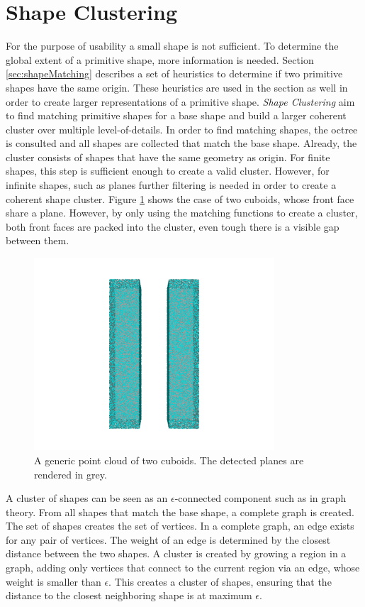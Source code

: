 \section{Shape Clustering}

For the purpose of usability a small shape is not sufficient. To determine the global extent of a primitive shape, more information is needed. Section \ref{sec:shapeMatching} describes a set of heuristics to determine if two primitive shapes have the same origin. These heuristics are used in the section as well in order to create larger representations of a primitive shape. 
\textit{Shape Clustering} aim to find matching primitive shapes for a base shape and build a larger coherent cluster over multiple level-of-details. 
In order to find matching shapes, the octree is consulted and all shapes are collected that match the base shape. Already, the cluster consists of shapes that have the same geometry as origin. For finite shapes, this step is sufficient enough to create a valid cluster. However, for infinite shapes, such as planes further filtering is needed in order to create a coherent shape cluster. Figure \ref{fig:cuboids} shows the case of two cuboids, whose front face share a plane. However, by only using the matching functions to create a cluster, both front faces are packed into the cluster, even tough there is a visible gap between them.

\begin{figure}
	\centering
	\includegraphics[width=0.8\textwidth]{Shape_Detection/cuboids.png}
	\caption{A generic point cloud of two cuboids. The detected planes are rendered in grey.}
	\label{fig:cuboids}
\end{figure}

A cluster of shapes can be seen as an $\epsilon$-connected component such as in graph theory. From all shapes that match the base shape, a complete graph is created. The set of shapes creates the set of vertices. In a complete graph, an edge exists for any pair of vertices. The weight of an edge is determined by the closest distance between the two shapes. A cluster is created by growing a region in a graph, adding only vertices that connect to the current region via an edge, whose weight is smaller than $\epsilon$. This creates a cluster of shapes, ensuring that the distance to the closest neighboring shape is at maximum $\epsilon$. 



